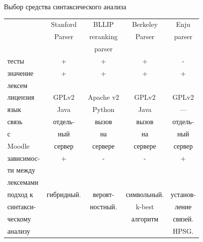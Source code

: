 \documentclass[10pt,ps,serif,mathserif]{beamer}
\begin{document}
    \begin{frame}{Выбор средства синтаксического анализа}
        \begin{tabular}{|l|c|c|c|c|}
        \hline
                   & \cellcolor{blue!25} Stanford         & BLLIP             & Berkeley       &   Enju           \\
                   & \cellcolor{blue!25}Parser           & reranking         & Parser         &   parser         \\
                   & \cellcolor{blue!25}                 & parser            &                &                  \\ \hline

        тесты      & \cellcolor{blue!25}\small +         & \small +          & \small +       &\small -          \\ \hline

        значение   & \cellcolor{blue!25}\small +         & \small +          & \small +       &\small +          \\
        лексем     & \cellcolor{blue!25}                 &                   &                &                  \\ \hline

        лицензия   & \cellcolor{blue!25} \small GPLv2    & \small Apache v2  & \small GPLv2   & \small GPLv2     \\ \hline

        язык       & \cellcolor{blue!25}\small Java      & \small Python     &\small Java     &\small ---        \\ \hline

        связь      & \cellcolor{blue!25}\small отдель-   &\small вызов       &\small вызов    &\small отдель-    \\
        с          & \cellcolor{blue!25}\small ный       &\small на          &\small на       &\small ный        \\
        Moodle     & \cellcolor{blue!25}\small сервер    &\small сервере     &\small сервере  &\small сервер     \\ \hline

        зависимос- & \cellcolor{blue!25}\small +         & \small -          &\small -        &\small +          \\
        ти между   & \cellcolor{blue!25}                 &                   &                &                  \\
        лексемами  & \cellcolor{blue!25}                 &                   &                &                  \\ \hline
        подход к   & \cellcolor{blue!25}гибридный.       & вероят-           & символьный.    & установ-         \\
        синтакси-  & \cellcolor{blue!25}                 & ностный.          & k-best         & ление            \\
        ческому    & \cellcolor{blue!25}                 &                   & алгоритм       & связей.          \\
        анализу    & \cellcolor{blue!25}                 &                   &                & HPSG.            \\ \hline


\end{tabular}
\end{frame}
\end{document}
